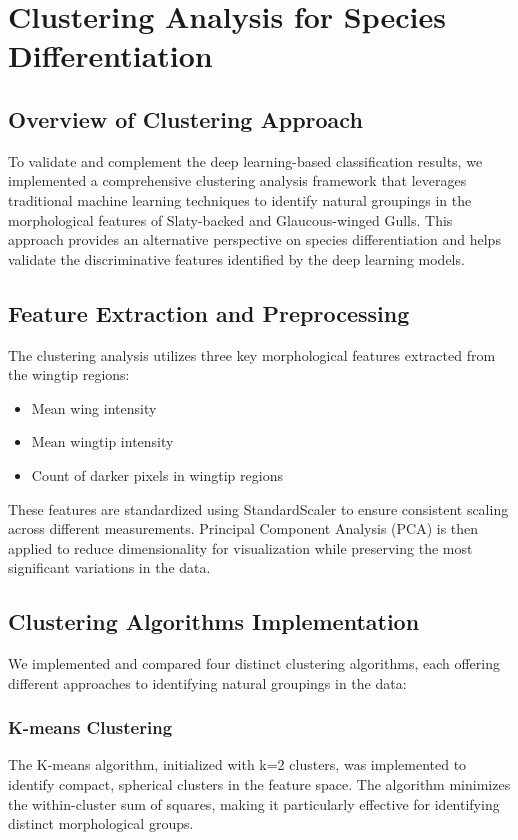 \documentclass[a4paper,12pt]{report}
\begin{document}
\section{Clustering Analysis for Species Differentiation}

\subsection{Overview of Clustering Approach}

To validate and complement the deep learning-based classification results, we implemented a comprehensive clustering analysis framework that leverages traditional machine learning techniques to identify natural groupings in the morphological features of Slaty-backed and Glaucous-winged Gulls. This approach provides an alternative perspective on species differentiation and helps validate the discriminative features identified by the deep learning models.

\subsection{Feature Extraction and Preprocessing}

The clustering analysis utilizes three key morphological features extracted from the wingtip regions:
\begin{itemize}
    \item Mean wing intensity
    \item Mean wingtip intensity
    \item Count of darker pixels in wingtip regions
\end{itemize}

These features are standardized using StandardScaler to ensure consistent scaling across different measurements. Principal Component Analysis (PCA) is then applied to reduce dimensionality for visualization while preserving the most significant variations in the data.

\subsection{Clustering Algorithms Implementation}

We implemented and compared four distinct clustering algorithms, each offering different approaches to identifying natural groupings in the data:

\subsubsection{K-means Clustering}
The K-means algorithm, initialized with k=2 clusters, was implemented to identify compact, spherical clusters in the feature space. The algorithm minimizes the within-cluster sum of squares, making it particularly effective for identifying distinct morphological groups.
\end{document}
